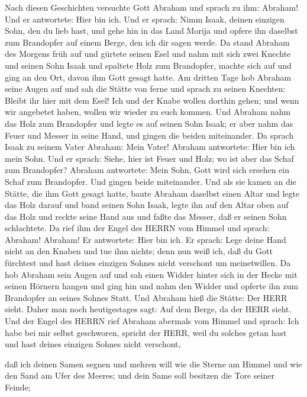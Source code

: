  Nach diesen Geschichten versuchte Gott Abraham und sprach
zu ihm: Abraham! Und er antwortete: Hier bin ich.  Und er
sprach: Nimm Isaak, deinen einzigen Sohn, den du lieb hast, und gehe hin
in das Land Morija und opfere ihn daselbst zum Brandopfer auf einem
Berge, den ich dir sagen werde.  Da stand Abraham des
Morgens früh auf und gürtete seinen Esel und nahm mit sich zwei Knechte
und seinen Sohn Isaak und spaltete Holz zum Brandopfer, machte sich auf
und ging an den Ort, davon ihm Gott gesagt hatte.  Am
dritten Tage hob Abraham seine Augen auf und sah die Stätte von ferne
 und sprach zu seinen Knechten: Bleibt ihr hier mit dem
Esel! Ich und der Knabe wollen dorthin gehen; und wenn wir angebetet
haben, wollen wir wieder zu euch kommen.  Und Abraham nahm
das Holz zum Brandopfer und legte es auf seinen Sohn Isaak; er aber nahm
das Feuer und Messer in seine Hand, und gingen die beiden miteinander.
 Da sprach Isaak zu seinem Vater Abraham: Mein Vater!
Abraham antwortete: Hier bin ich mein Sohn. Und er sprach: Siehe, hier
ist Feuer und Holz; wo ist aber das Schaf zum Brandopfer? 
Abraham antwortete: Mein Sohn, Gott wird sich ersehen ein Schaf zum
Brandopfer. Und gingen beide miteinander.  Und als sie kamen
an die Stätte, die ihm Gott gesagt hatte, baute Abraham daselbst einen
Altar und legte das Holz darauf und band seinen Sohn Isaak, legte ihn
auf den Altar oben auf das Holz  und reckte seine Hand aus
und faßte das Messer, daß er seinen Sohn schlachtete.  Da
rief ihm der Engel des HERRN vom Himmel und sprach: Abraham! Abraham! Er
antwortete: Hier bin ich.  Er sprach: Lege deine Hand nicht
an den Knaben und tue ihm nichts; denn nun weiß ich, daß du Gott
fürchtest und hast deines einzigen Sohnes nicht verschont um
meinetwillen.  Da hob Abraham sein Augen auf und sah einen
Widder hinter sich in der Hecke mit seinen Hörnern hangen und ging hin
und nahm den Widder und opferte ihn zum Brandopfer an seines Sohnes
Statt.  Und Abraham hieß die Stätte: Der HERR sieht. Daher
man noch heutigestages sagt: Auf dem Berge, da der HERR sieht.
 Und der Engel des HERRN rief Abraham abermals vom Himmel
 und sprach: Ich habe bei mir selbst geschworen, spricht
der HERR, weil du solches getan hast und hast deines einzigen Sohnes
nicht verschont,

 daß ich deinen Samen segnen und mehren will wie die Sterne
am Himmel und wie den Sand am Ufer des Meeres; und dein Same soll
besitzen die Tore seiner Feinde;

